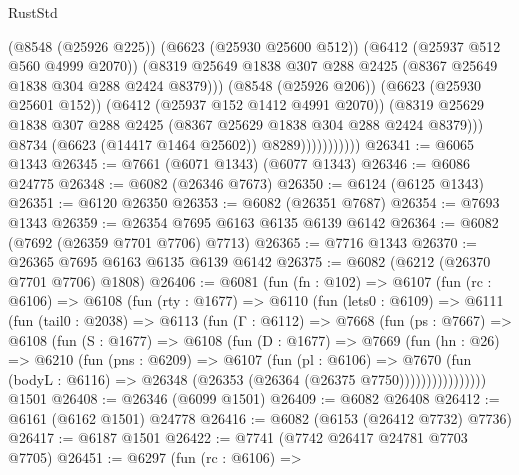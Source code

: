 \begin{lexlean}{RustStd}
\begin{coremodule}
                              (@8548 (@25926 @225))
                              (@6623 (@25930 @25600 @512))
                              (@6412 (@25937 @512 @560 @4999 @2070))
                              (@8319
                                @25649
                                @1838
                                @307
                                @288
                                @2425
                                (@8367 @25649 @1838 @304 @288 @2424 @8379)))
                            (@8548 (@25926 @206))
                            (@6623 (@25930 @25601 @152))
                            (@6412 (@25937 @152 @1412 @4991 @2070))
                            (@8319
                              @25629
                              @1838
                              @307
                              @288
                              @2425
                              (@8367 @25629 @1838 @304 @288 @2424 @8379)))
                          @8734
                          (@6623 (@14417 @1464 @25602))
                          @8289)))))))))))
@26341 := @6065 @1343
@26345 := @7661 (@6071 @1343) (@6077 @1343)
@26346 := @6086 @24775
@26348 := @6082 (@26346 @7673)
@26350 := @6124 (@6125 @1343)
@26351 := @6120 @26350
@26353 := @6082 (@26351 @7687)
@26354 := @7693 @1343
@26359 := @26354 @7695 @6163 @6135 @6139 @6142
@26364 := @6082 (@7692 (@26359 @7701 @7706) @7713)
@26365 := @7716 @1343
@26370 := @26365 @7695 @6163 @6135 @6139 @6142
@26375 := @6082 (@6212 (@26370 @7701 @7706) @1808)
@26406 := @6081
    (fun (fn : @102) =>
    @6107
      (fun (rc : @6106) =>
      @6108
        (fun (rty : @1677) =>
        @6110
          (fun (lets0 : @6109) =>
          @6111
            (fun (tail0 : @2038) =>
            @6113
              (fun (Γ : @6112) =>
              @7668
                (fun (ps : @7667) =>
                @6108
                  (fun (S : @1677) =>
                  @6108
                    (fun (D : @1677) =>
                    @7669
                      (fun (hn : @26) =>
                      @6210
                        (fun (pns : @6209) =>
                        @6107
                          (fun (pl : @6106) =>
                          @7670
                            (fun (bodyL : @6116) =>
                            @26348 (@26353 (@26364 (@26375 @7750))))))))))))))))
    @1501
@26408 := @26346 (@6099 @1501)
@26409 := @6082 @26408
@26412 := @6161 (@6162 @1501) @24778
@26416 := @6082 (@6153 (@26412 @7732) @7736)
@26417 := @6187 @1501
@26422 := @7741 (@7742 @26417 @24781 @7703 @7705)
@26451 := @6297
    (fun (rc : @6106) =>

\end{coremodule}
\end{lexlean}
